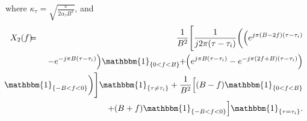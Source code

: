 where $\kappa_\tau = \sqrt{\frac{\pi}{2\alpha_{\tau}B^{2}}}$, and
\begin{eqnarray}
X_{2}(f) & \hspace{-2mm}  = & \hspace{-2mm} \frac{1}{B^{2}} \Bigg[\frac{1}{j2\pi(\tau-\tau_{i})}\bigg(\Big(e^{j\pi (B-2f)(\tau-\tau_{i})} \nonumber \\
& \hspace{-25mm} & \hspace{-17mm} 
-e^{-j\pi B(\tau-\tau_{i})}\Big) 
\mathbbm{1}_{\{0<f<B\}}  \hspace{-1mm} +  \hspace{-1mm} \left(e^{j\pi B(\tau-\tau_{i})}-e^{-j\pi (2f+B)(\tau-\tau_{i})}\right) \nonumber \\
& \hspace{-25mm} & \hspace{-17mm} 
\mathbbm{1}_{\{-B<f<0\}}\bigg)\Bigg] 
\mathbbm{1}_{\{\tau\neq\tau_{i}\}}\hspace{-0mm}+\hspace{-0mm}\frac{1}{B^{2}}\Big[(B-f)\mathbbm{1}_{\{0<f<B\}} 
\nonumber \\
& \hspace{-25mm} & \hspace{-17mm}
+(B+f)\mathbbm{1}_{\{-B<f<0\}}\Big]\mathbbm{1}_{\{\tau=\tau_{i}\}}.
\end{eqnarray}

